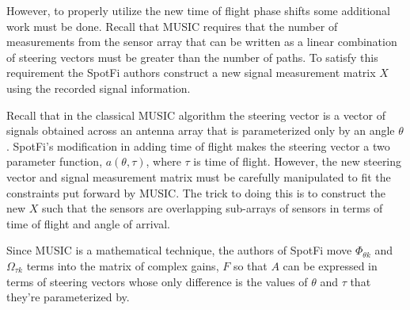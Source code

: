 \documentclass[12pt]{report}
\begin{document}
However, to properly utilize the new time of flight phase shifts some additional work must be done. Recall that MUSIC requires that the number of measurements from the sensor array that can be written as a linear combination of steering vectors must be greater than the number of paths. To satisfy this requirement the SpotFi authors construct a new signal measurement matrix $X$ using the recorded signal information. \par

Recall that in the classical MUSIC algorithm the steering vector is a vector of signals obtained across an antenna array that is parameterized only by an angle $\theta$. SpotFi's modification in adding time of flight makes the steering vector a two parameter function, $a(\theta, \tau)$, where $\tau$ is time of flight. However, the new steering vector and signal measurement matrix must be carefully manipulated to fit the constraints put forward by MUSIC. The trick to doing this is to construct the new $X$ such that the sensors are overlapping sub-arrays of sensors in terms of time of flight and angle of arrival. 


Since MUSIC is a mathematical technique, the authors of SpotFi move $\Phi_{\theta k}$ and $\Omega_{\tau k}$ terms into the matrix of complex gains, $F$ so that $A$ can be expressed in terms of steering vectors whose only difference is the values of $\theta$ and $\tau$ that they're parameterized by. 


\begin{figure}[!htb]
    \begin{center}
        \caption{}
        \label{figure: spotfi-smoothing-explained}
        \begin{subfigure}[b]{0.3\textwidth}
            \caption{}
            \label{subfigure: smoothed-csi-matrix}
            \centerline{\scalebox{0.5}{}}
        \end{subfigure}
        \par\bigskip
        \begin{subfigure}[b]{0.3\textwidth}
            \caption{}
            \label{subfigure: steering-matrix}
            \centerline{\scalebox{0.5}{}}
        \end{subfigure}
        \par\bigskip
        \begin{subfigure}[b]{0.3\textwidth}
            \caption{}
            \label{subfigure: complex-gains-matrix}
            \centerline{\scalebox{0.5}{}}
        \end{subfigure}
        \par\bigskip
    \end{center}
\end{figure}
\end{document}
